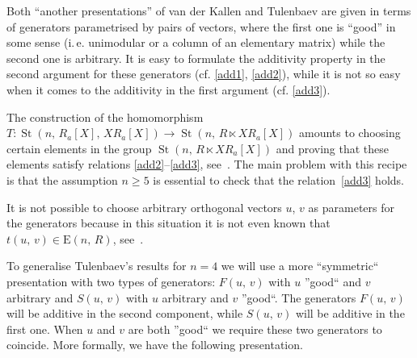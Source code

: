 \documentclass[11pt]{amsart}
\theoremstyle{plain} \declaretheorem[name=Theorem, Refname={Theorem,Theorems}]{tm} \Crefname{tm}{Theorem}{Theorems}
\numberwithin{equation}{section}
\theoremstyle{definition} \newtheorem{df}[lm]{Definition} \Crefname{df}{Definition}{Definitions}
\theoremstyle{remark} \newtheorem{rk}[lm]{Remark} \Crefname{rk}{Remark}{Remarks}
\newcommand{\E}{{\mathrm{E}}}
\newcommand{\St}{\mathop{\mathrm{St}}\nolimits}
\begin{document}
Both ``another presentations'' of van der Kallen and Tulenbaev are given in terms of generators parametrised by pairs of vectors,
 where the first one is ``good'' in some sense  (i.\,e. unimodular or a column of an elementary matrix) while the second one is arbitrary.
It is easy to formulate the additivity property in the second argument for these generators (cf. \eqref{add1}, \eqref{add2}),
while it is not so easy when it comes to the additivity in the first argument (cf. \eqref{add3}).

The construction of the homomorphism $T\colon\St(n,\,R_a[X],\,XR_a[X])\rightarrow\St(n,\,R\ltimes XR_a[X])$
amounts to choosing certain elements in the group $\St(n,\,R\ltimes XR_a[X])$ and proving that these elements satisfy relations \eqref{add2}--\eqref{add3}, see~\cite[Lemmas~1.2 and~1.3\,c)]{Tul}.
The main problem with this recipe is that the assumption $n\geq5$ is essential to check that the relation~\eqref{add3} holds.

It is not possible to choose arbitrary orthogonal vectors $u$, $v$ as parameters for the generators because in this situation it is not even known that $t(u,\,v)\in\E(n,\,R)$, see~\cite{Rao}. 

To generalise Tulenbaev's results for $n=4$ we will use a more ``symmetric`` presentation with two types of generators: 
$F(u,\,v)$ with $u$ ''good`` and $v$ arbitrary and $S(u,\,v)$ with $u$ arbitrary and $v$ ''good``.
The generators $F(u,\,v)$ will be additive in the second component, while $S(u,\,v)$ will be additive in the first one.
When $u$ and $v$ are both ''good`` we require these two generators to coincide.
More formally, we have the following presentation.
\end{document}
